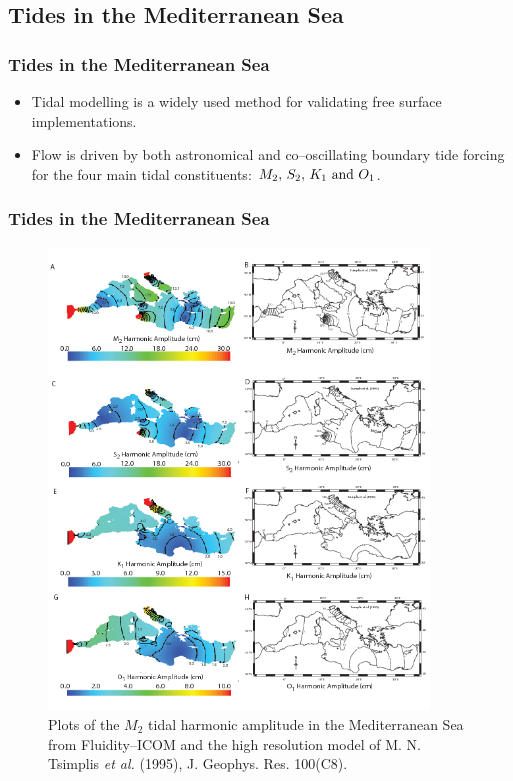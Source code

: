 \subsection{Tides in the Mediterranean Sea}

\begin{frame}
    \frametitle{Tides in the Mediterranean Sea}
\begin{itemize}
\item Tidal modelling is a widely used method for validating free surface implementations.
\item Flow is driven by both astronomical and co--oscillating boundary tide forcing for the four main tidal constituents: \mbox{$M_2, \, S_2, \, K_1 \,\, {\rm and} \,\, O_1$}.
\end{itemize}
\end{frame}
%
\begin{frame}
    \frametitle{Tides in the Mediterranean Sea}
\begin{figure}
\centering
\includegraphics[width=0.9\textwidth, clip = True, trim = 5mm 180mm 0mm 0mm]{./tides_in_the_Mediterranean_Sea/amp.png}
\caption{Plots of the $M_2$ tidal harmonic amplitude in the Mediterranean Sea from Fluidity--ICOM and the high resolution
model of M. N. Tsimplis {\it et al.} (1995), J. Geophys. Res. 100(C8).}
\end{figure}
\end{frame}
